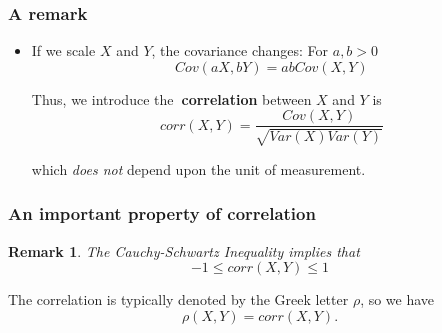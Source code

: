\documentclass[notes=show,handout]{beamer}
\newenvironment{stepitemize}{\begin{itemize}[<+->]}{\end{itemize} }
\newtheorem{remark}{Remark}[section]
\begin{document}
\begin{frame}
\frametitle{A remark}

\begin{stepitemize}
\item If we scale $X$ and $Y$, the covariance changes: For $a,b>0$%
\begin{equation*}
Cov\left( aX,bY\right) =abCov\left( X,Y\right)
\end{equation*}

Thus, we introduce the\textbf{\ correlation} between $X$ and $Y$ is
\begin{equation*}
corr\left( X,Y\right) =\frac{Cov\left( X,Y\right) }{\sqrt{Var\left( X\right)
Var\left( Y\right) }}
\end{equation*}

which \emph{does not }depend upon the unit of measurement.


\end{stepitemize}


\end{frame}


%


\begin{frame}%
%
\frametitle{An important property of correlation}
\begin{remark}
The Cauchy-Schwartz Inequality implies that 
\begin{equation*}
-1\leq corr\left( X,Y\right) \leq 1
\end{equation*}
\end{remark}

\vspace{0.4cm}

The correlation is typically denoted by the Greek letter $\rho$, so we have 
$$
\rho(X,Y)= corr\left( X,Y\right).
$$
\end{frame}%
\end{document}
